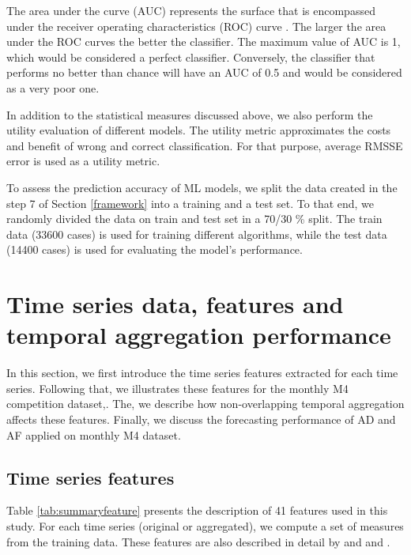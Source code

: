 \documentclass[]{elsarticle} %
\begin{document}
The area under the curve (AUC) represents the surface that is
encompassed under the receiver operating characteristics (ROC) curve
\citep{james2021statistical}. The larger the area under the ROC curves
the better the classifier. The maximum value of AUC is 1, which would be
considered a perfect classifier. Conversely, the classifier that
performs no better than chance will have an AUC of 0.5 and would be
considered as a very poor one.

In addition to the statistical measures discussed above, we also perform
the utility evaluation of different models. The utility metric
approximates the costs and benefit of wrong and correct classification.
For that purpose, average RMSSE error is used as a utility metric.

To assess the prediction accuracy of ML models, we split the data
created in the step 7 of Section \ref{framework} into a training and a
test set. To that end, we randomly divided the data on train and test
set in a 70/30 \% split. The train data (33600 cases) is used for
training different algorithms, while the test data (14400 cases) is used
for evaluating the model's performance.

\hypertarget{tsfeature}{%
\section{Time series data, features and temporal aggregation
performance}\label{tsfeature}}

In this section, we first introduce the time series features extracted
for each time series. Following that, we illustrates these features for
the monthly M4 competition dataset,. The, we describe how
non-overlapping temporal aggregation affects these features. Finally, we
discuss the forecasting performance of AD and AF applied on monthly M4
dataset.

\hypertarget{time-series-features}{%
\subsection{Time series features}\label{time-series-features}}

Table \ref{tab:summaryfeature} presents the description of 41 features
used in this study. For each time series (original or aggregated), we
compute a set of measures from the training data. These features are
also described in detail by \citet{wang2009rule} and
\citet{hyndman2015large} and \citet{hyndman2021forecasting}.
\end{document}
